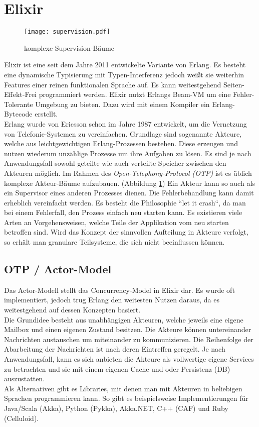 \documentclass[10pt,journal,compsoc]{IEEEtran}
\begin{document}
\section{Elixir}
\begin{figure}
\centering
\texttt{[image: supervision.pdf]}
\caption{komplexe Supervision-Bäume}
\label{fig_supervision}
\end{figure}
Elixir \cite{programmingElixir} ist eine seit dem Jahre 2011 entwickelte Variante von Erlang. Es besteht eine dynamische Typisierung mit Typen-Interferenz jedoch weißt sie weiterhin Features einer reinen funktionalen Sprache auf. Es kann weitestgehend Seiten-Effekt-Frei programmiert werden. Elixir nutzt Erlangs Beam-VM um eine Fehler-Tolerante Umgebung zu bieten. Dazu wird mit einem Kompiler ein Erlang-Bytecode erstellt.
\\ Erlang wurde von Ericsson schon im Jahre 1987 entwickelt, um die Vernetzung von Telefonie-Systemen zu vereinfachen.
Grundlage sind sogenannte Akteure, welche aus leichtgewichtigen Erlang-Prozessen bestehen. Diese erzeugen und nutzen wiederum unzählige Prozesse um ihre Aufgaben zu lösen. Es sind je nach Anwendungsfall sowohl geteilte wie auch verteilte Speicher zwischen den Akteuren möglich.
Im Rahmen des \textit{Open-Telephony-Protocol (OTP)} ist es üblich komplexe Akteur-Bäume aufzubauen. (Abbildung \ref{fig_supervision}) Ein Akteur kann so auch als ein Supervisor eines anderen Prozesses dienen. Die Fehlerbehandlung kann damit erheblich vereinfacht werden. Es besteht die Philosophie ``let it crash``, da man bei einem Fehlerfall, den Prozess einfach neu starten kann. Es existieren viele Arten an Vorgehensweisen, welche Teile der Applikation vom neu starten betroffen sind. Wird das Konzept der sinnvollen Aufteilung in Akteure verfolgt, so erhält man granulare Teilsysteme, die sich nicht beeinflussen können.
\subsection{OTP / Actor-Model}
Das Actor-Modell stellt das Concurrency-Model in Elixir dar. Es wurde oft implementiert, jedoch trug Erlang den weitesten Nutzen daraus, da es weitestgehend auf dessen Konzepten basiert.
\\ Die Grundidee besteht aus unabhängigen Akteuren, welche jeweils eine eigene Mailbox und einen eigenen Zustand besitzen. Die Akteure können untereinander Nachrichten austauschen um miteinander zu kommunizieren. Die Reihenfolge der Abarbeitung der Nachrichten ist nach deren Eintreffen geregelt. Je nach Anwendungsfall, kann es sich anbieten die Akteure als vollwertige eigene Services zu betrachten und sie mit einem eigenen Cache und oder Persistenz (DB) auszustatten.
\\ Als Alternativen gibt es Libraries, mit denen man mit Akteuren in beliebigen Sprachen programmieren kann. So gibt es beispielsweise Implementierungen für Java/Scala (Akka), Python (Pykka), Akka.NET, C++ (CAF) und Ruby (Celluloid).
\end{document}
